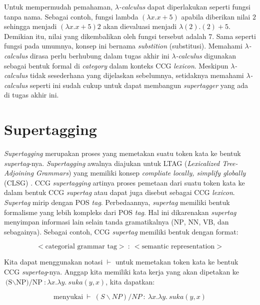 Untuk mempermudah pemahaman, {$\lambda$}\textit{-calculus} dapat diperlakukan seperti fungsi tanpa
nama. Sebagai contoh, fungsi lambda $({\lambda}x. x + 5)$ apabila diberikan nilai $2$ sehingga
menjadi $({\lambda}x. x + 5) 2$ akan dievaluasi menjadi ${\lambda}(2). (2) + 5$.
Demikian itu, nilai yang dikembalikan oleh fungsi tersebut adalah $7$.
Sama seperti fungsi pada umumnya, konsep ini bernama \textit{substition} (substitusi).
Memahami {$\lambda$}\textit{-calculus} dirasa perlu berhubung dalam tugas akhir ini
{$\lambda$}\textit{-calculus} digunakan sebagai bentuk formal di \textit{category}
dalam konteks CCG \textit{lexicon}. Meskipun {$\lambda$}\textit{-calculus} tidak sesederhana
yang dijelaskan sebelumnya, setidaknya memahami {$\lambda$}\textit{-calculus} seperti ini
sudah cukup untuk dapat membangun \textit{supertagger} yang ada di tugas akhir ini.


\section{Supertagging}
\textit{Supertagging} merupakan proses yang memetakan suatu token kata ke bentuk
\textit{supertag}-nya.
\textit{Supertagging} awalnya diajukan untuk LTAG (\textit{Lexicalized Tree-Adjoining Grammars})
yang memiliki konsep \textit{compliate locally, simplify globally} (CLSG)
\cite{DBLP:journals/corr/Rama14b}.
CCG \textit{supertagging} artinya proses pemetaan dari suatu token
kata ke dalam bentuk CCG \textit{supertag} atau dapat juga disebut sebagai CCG \textit{lexicon}.
\textit{Supertag} mirip dengan POS \textit{tag}.
Perbedaannya, \textit{supertag} memiliki bentuk formalisme yang lebih kompleks dari POS
\textit{tag}.
Hal ini dikarenakan \textit{supertag} menyimpan informasi lain selain tanda gramatikalnya
($\text{NP}$, $\text{NN}$, $\text{VB}$, dan sebagainya).
Sebagai contoh, CCG \textit{supertag} memiliki bentuk dengan format:

\begin{equation*}
<\text{categorial\ grammar\ tag}>\ :\ <\text{semantic\ representation}>
\end{equation*}

Kita dapat menggunakan notasi $\vdash$ untuk memetakan token kata ke bentuk CCG
\textit{supertag}-nya.
Anggap kita memiliki kata kerja  yang akan dipetakan ke
$\text{(S{$\backslash$}NP)/NP}: \lambda x.\lambda y.\ suka(y, x)$, kita dapatkan:

\begin{equation*}
  \text{menyukai}\ \vdash\ (S{\backslash}NP)/NP\ :\ \lambda x.\lambda y.\ suka(y, x)
\end{equation*}

